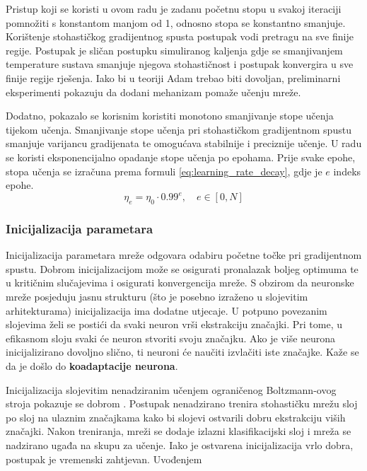 \documentclass[times, utf8, numeric, diplomski]{fer}
\begin{document}
Pristup koji se koristi u ovom radu je zadanu početnu stopu u svakoj iteraciji pomnožiti s konstantom manjom od 1, odnosno stopa se konstantno smanjuje. Korištenje stohastičkog gradijentnog spusta postupak vodi pretragu na sve finije regije. Postupak je sličan postupku simuliranog kaljenja gdje se smanjivanjem temperature sustava smanjuje njegova stohastičnost i postupak konvergira u sve finije regije rješenja. Iako bi u teoriji Adam trebao biti dovoljan, preliminarni eksperimenti pokazuju da dodani mehanizam pomaže učenju mreže.

Dodatno, pokazalo se korisnim koristiti monotono smanjivanje stope učenja tijekom učenja. Smanjivanje stope učenja pri stohastičkom gradijentnom spustu smanjuje varijancu gradijenata te omogućava stabilnije i preciznije učenje. U radu se koristi eksponencijalno opadanje stope učenja po epohama. Prije svake epohe, stopa učenja se izračuna prema formuli \eqref{eq:learning_rate_decay}, gdje je $e$ indeks epohe.
\begin{equation}
\label{eq:learning_rate_decay}
\eta_e = \eta_0 \cdot 0.99^e,\quad e \in [0, N]
\end{equation}

\subsubsection{Inicijalizacija parametara}
Inicijalizacija parametara mreže odgovara odabiru početne točke pri gradijentnom spustu. Dobrom inicijalizacijom može se osigurati pronalazak boljeg optimuma te u kritičnim slučajevima i osigurati konvergencija mreže. S obzirom da neuronske mreže posjeduju jasnu strukturu (što je posebno izraženo u slojevitim arhitekturama) inicijalizacija ima dodatne utjecaje. U potpuno povezanim slojevima želi se postići da svaki neuron vrši ekstrakciju značajki. Pri tome, u efikasnom sloju svaki će neuron stvoriti svoju značajku. Ako je više neurona inicijalizirano dovoljno slično, ti neuroni će naučiti izvlačiti iste značajke. Kaže se da je došlo do \textbf{koadaptacije neurona}.

Inicijalizacija slojevitim nenadziranim učenjem ograničenog Boltzmann-ovog stroja  pokazuje se dobrom \citep{relu6}. Postupak nenadzirano trenira stohastičku mrežu sloj po sloj na ulaznim značajkama kako bi slojevi ostvarili dobru ekstrakciju viših značajki. Nakon treniranja, mreži se dodaje izlazni klasifikacijski sloj i mreža se nadzirano ugađa na skupu za učenje. Iako je ostvarena inicijalizacija vrlo dobra, postupak je vremenski zahtjevan. Uvođenjem 
\end{document}
